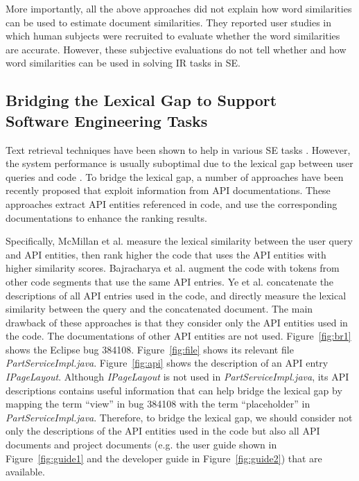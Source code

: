 More importantly, all the above approaches did not explain how word similarities can be used to estimate document similarities. They reported user studies in which human subjects were recruited to evaluate whether the word similarities are accurate. However, these subjective evaluations do not tell whether and how word similarities can be used in solving IR tasks in SE.

\subsection{Bridging the Lexical Gap to Support \\Software Engineering Tasks}

Text retrieval techniques have been shown to help in various SE tasks \cite{Haiduc:2013:AQR:2486788.2486898, marcus2012use}. However, the system performance is usually suboptimal due to the lexical gap between user queries and code \cite{5989838}. To bridge the lexical gap, a number of approaches \cite{Bajracharya:2010:LUS:1882291.1882316, Chatterjee:2009:SSE:1533013.1533048, Dasgupta:2013:EST:2550526.2550586, 5989838, Stylos:2006:MWT:1174509.1174678, Ye:FSE14} have been recently proposed that exploit information from API documentations. These approaches extract API entities referenced in code, and use the corresponding documentations to enhance the ranking results.

Specifically, McMillan et al. \cite{5989838} measure the lexical similarity between the user query and API entities, then rank higher the code that uses the API entities with higher similarity scores. Bajracharya et al. \cite{Bajracharya:2010:LUS:1882291.1882316} augment the code with tokens from other code segments that use the same API entries. Ye et al. \cite{Ye:FSE14} concatenate the descriptions of all API entries used in the code, and directly measure the lexical similarity between the query and the concatenated document. The main drawback of these approaches is that they consider only the API entities used in the code. The documentations of other API entities are not used. Figure~\ref{fig:br1} shows the Eclipse bug 384108. Figure~\ref{fig:file} shows its relevant file {\it PartServiceImpl.java}. Figure~\ref{fig:api} shows the description of an API entry {\it IPageLayout}. Although {\it IPageLayout} is not used in {\it PartServiceImpl.java}, its API descriptions contains useful information that can help bridge the lexical gap by mapping the term ``view'' in bug 384108 with the term ``placeholder'' in {\it PartServiceImpl.java}. Therefore, to bridge the lexical gap, we should consider not only the descriptions of the API entities used in the code but also all API documents and project documents (e.g. the user guide shown in Figure~\ref{fig:guide1} and the developer guide in Figure~\ref{fig:guide2}) that are available.

